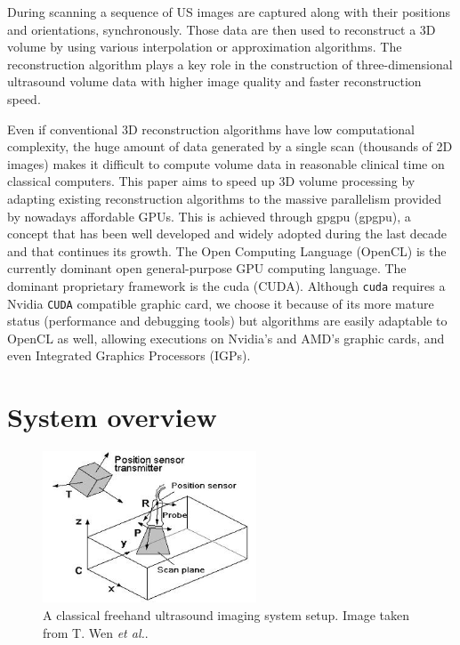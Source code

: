 \documentclass[12pt,journal,compsoc]{IEEEtran}
\begin{document}
During scanning a sequence of US images are captured along with their positions and orientations, synchronously. Those data are then used to reconstruct a 3D volume by using various interpolation or approximation algorithms. The reconstruction algorithm plays a key role in the construction of three-dimensional ultrasound volume data with higher image quality and faster reconstruction speed.\par

Even if conventional 3D reconstruction algorithms have low computational complexity, the huge amount of data generated by a single scan (thousands of 2D images) makes it difficult to compute volume data in reasonable clinical time on classical computers.
This paper aims to speed up 3D volume processing by adapting existing reconstruction algorithms to the massive parallelism provided by nowadays affordable GPUs. This is achieved through \acl{gpgpu} (\ac{gpgpu}), a concept that has been well developed and widely adopted during the last decade and that continues its growth.
The Open Computing Language (OpenCL) is the currently dominant open general-purpose GPU computing language. The dominant proprietary framework is the \acl{cuda} (CUDA).
Although \texttt{cuda} requires a Nvidia \texttt{CUDA} compatible graphic card, we choose it because of its more mature status (performance and debugging tools) but algorithms are easily adaptable to OpenCL as well, allowing executions on Nvidia's and AMD's graphic cards, and even Integrated Graphics Processors (IGPs).


\section{System overview}

\begin{figure}[!ht]
\centering
\includegraphics[width=2.5in]{freehand}
\caption{A classical freehand ultrasound imaging system setup. Image taken from T. Wen \textit{et al.}\cite{2}.}
\label{fig_1}
\end{figure}
\end{document}
